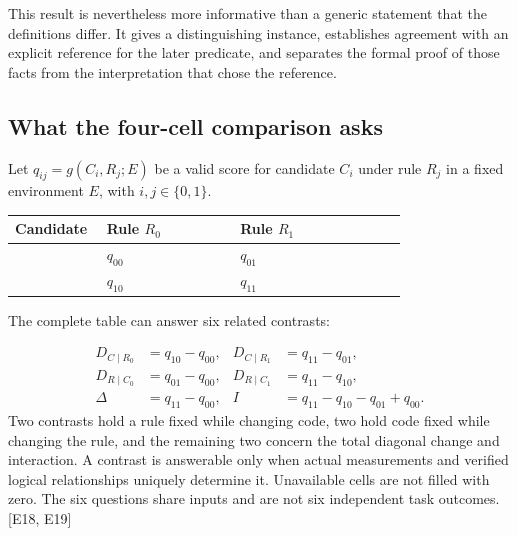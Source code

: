 This result is nevertheless more informative than a generic statement that the definitions differ. It gives a distinguishing instance, establishes agreement with an explicit reference for the later predicate, and separates the formal proof of those facts from the interpretation that chose the reference.

\subsection[What the four-cell comparison asks]{\texorpdfstring{\protect\hypertarget{d6}{}What the four-cell comparison asks}{What the four-cell comparison asks}}
Let $q_{ij}=g(C_i,R_j;E)$ be a valid score for candidate $C_i$ under rule $R_j$ in a fixed environment $E$, with $i,j\in\{0,1\}$.

\begingroup\small\setlength{\tabcolsep}{3pt}\renewcommand{\arraystretch}{1.14}
\par\nopagebreak\medskip\noindent\begin{minipage}[t]{\linewidth}
\begin{tabular}{>{\raggedright\arraybackslash}p{0.22\linewidth}>{\raggedright\arraybackslash}p{0.32\linewidth}>{\raggedright\arraybackslash}p{0.4\linewidth}}
\toprule
\textbf{Candidate} & \textbf{Rule $R_0$} & \textbf{Rule $R_1$}\\\midrule

{Earlier $C_0$} & {$q_{00}$} & {$q_{01}$}\\
{Later $C_1$} & {$q_{10}$} & {$q_{11}$}\\
\bottomrule\end{tabular}\end{minipage}\par\medskip\endgroup
The complete table can answer six related contrasts:

\[
\begin{aligned}
D_{C\mid R_0}&=q_{10}-q_{00}, & D_{C\mid R_1}&=q_{11}-q_{01},\\
D_{R\mid C_0}&=q_{01}-q_{00}, & D_{R\mid C_1}&=q_{11}-q_{10},\\
\Delta&=q_{11}-q_{00}, & I&=q_{11}-q_{10}-q_{01}+q_{00}.
\end{aligned}
\]
Two contrasts hold a rule fixed while changing code, two hold code fixed while changing the rule, and the remaining two concern the total diagonal change and interaction. A contrast is answerable only when actual measurements and verified logical relationships uniquely determine it. Unavailable cells are not filled with zero. The six questions share inputs and are not six independent task outcomes. [E18, E19]

